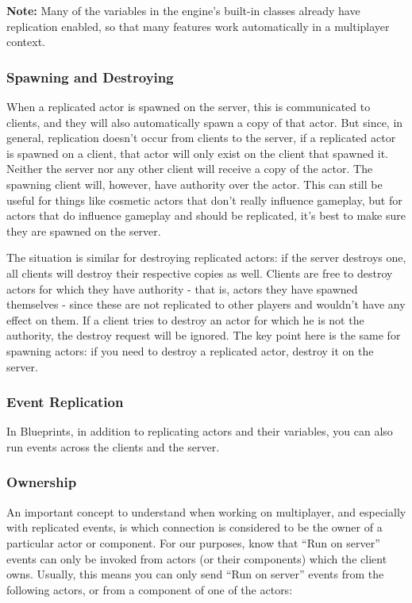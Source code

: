 \documentclass[
  letterpaper,
  DIV=11,
  numbers=noendperiod]{scrartcl}
\begin{document}
\textbf{Note:} Many of the variables in the engine's built-in classes
already have replication enabled, so that many features work
automatically in a multiplayer context.

\subsubsection{Spawning and Destroying}\label{spawning-and-destroying}

When a replicated actor is spawned on the server, this is communicated
to clients, and they will also automatically spawn a copy of that actor.
But since, in general, replication doesn't occur from clients to the
server, if a replicated actor is spawned on a client, that actor will
only exist on the client that spawned it. Neither the server nor any
other client will receive a copy of the actor. The spawning client will,
however, have authority over the actor. This can still be useful for
things like cosmetic actors that don't really influence gameplay, but
for actors that do influence gameplay and should be replicated, it's
best to make sure they are spawned on the server.

The situation is similar for destroying replicated actors: if the server
destroys one, all clients will destroy their respective copies as well.
Clients are free to destroy actors for which they have authority - that
is, actors they have spawned themselves - since these are not replicated
to other players and wouldn't have any effect on them. If a client tries
to destroy an actor for which he is not the authority, the destroy
request will be ignored. The key point here is the same for spawning
actors: if you need to destroy a replicated actor, destroy it on the
server.

\subsubsection{Event Replication}\label{event-replication}

In Blueprints, in addition to replicating actors and their variables,
you can also run events across the clients and the server.

\subsubsection{Ownership}\label{ownership}

An important concept to understand when working on multiplayer, and
especially with replicated events, is which connection is considered to
be the owner of a particular actor or component. For our purposes, know
that ``Run on server'' events can only be invoked from actors (or their
components) which the client owns. Usually, this means you can only send
``Run on server'' events from the following actors, or from a component
of one of the actors:
\end{document}
